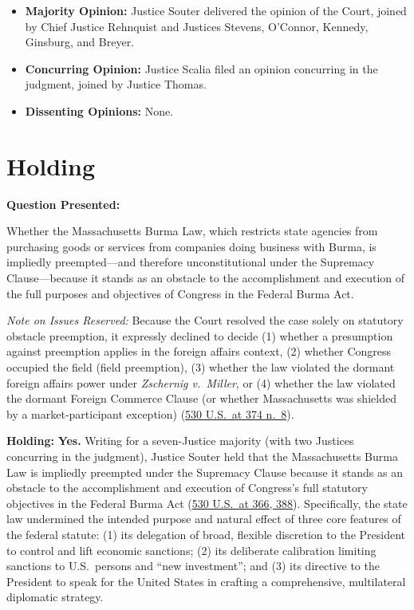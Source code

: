 \documentclass[12pt]{article}
\begin{document}
\begin{itemize}
    \item \textbf{Majority Opinion:} Justice Souter delivered the opinion of the Court, joined by Chief Justice Rehnquist and Justices Stevens, O'Connor, Kennedy, Ginsburg, and Breyer.
    \item \textbf{Concurring Opinion:} Justice Scalia filed an opinion concurring in the judgment, joined by Justice Thomas.
    \item \textbf{Dissenting Opinions:} None.
\end{itemize}

\section{Holding}
\textbf{Question Presented:}

Whether the Massachusetts Burma Law, which restricts state agencies from purchasing goods or services from companies doing business with Burma, is impliedly preempted---and therefore unconstitutional under the Supremacy Clause---because it stands as an obstacle to the accomplishment and execution of the full purposes and objectives of Congress in the Federal Burma Act.

\textit{Note on Issues Reserved:} Because the Court resolved the case solely on statutory obstacle preemption, it expressly declined to decide (1) whether a presumption against preemption applies in the foreign affairs context, (2) whether Congress occupied the field (field preemption), (3) whether the law violated the dormant foreign affairs power under \textit{Zschernig v.\ Miller}, or (4) whether the law violated the dormant Foreign Commerce Clause (or whether Massachusetts was shielded by a market-participant exception) (\href{https://www.law.cornell.edu/supct/html/99-474.ZO.html}{530 U.S.\ at 374 n.\ 8}).

\textbf{Holding:} \textbf{Yes.} Writing for a seven-Justice majority (with two Justices concurring in the judgment), Justice Souter held that the Massachusetts Burma Law is impliedly preempted under the Supremacy Clause because it stands as an obstacle to the accomplishment and execution of Congress's full statutory objectives in the Federal Burma Act (\href{https://www.law.cornell.edu/supct/html/99-474.ZO.html}{530 U.S.\ at 366, 388}). Specifically, the state law undermined the intended purpose and natural effect of three core features of the federal statute: (1) its delegation of broad, flexible discretion to the President to control and lift economic sanctions; (2) its deliberate calibration limiting sanctions to U.S.\ persons and ``new investment''; and (3) its directive to the President to speak for the United States in crafting a comprehensive, multilateral diplomatic strategy.
\end{document}
